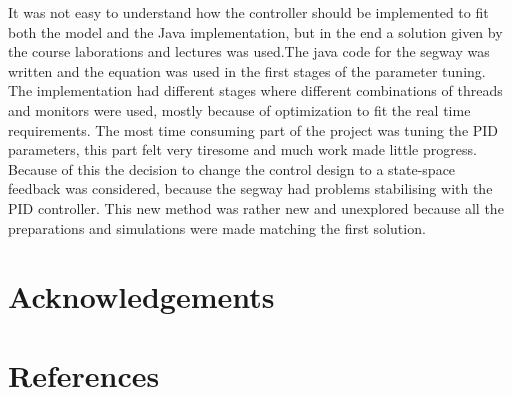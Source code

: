 \documentclass[a4paper]{article}
\begin{document}
It was not easy to understand how the controller should be implemented to fit both the model and the Java implementation, but in the end a solution given by the course laborations and lectures was used.The java code for the segway was written and the equation was used in the first stages of the parameter tuning. The implementation had different stages where different combinations of threads and monitors were used, mostly because of optimization to fit the real time requirements. The most time consuming part of the project was tuning the PID parameters, this part felt very tiresome and much work made little progress. Because of this the decision to change the control design to a state-space feedback was considered, because the segway had problems stabilising with the PID controller. This new method was rather new and unexplored because all the preparations and simulations were made matching the first solution. 

\section{Acknowledgements}

\section{References}
\end{document}

